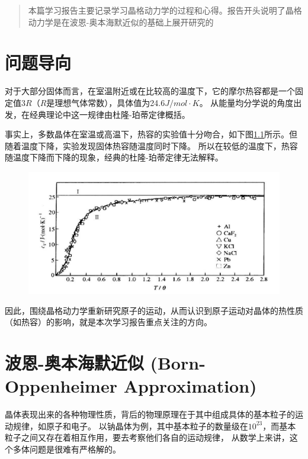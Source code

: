 \documentclass[declarePage]{ecnuthesis}
\begin{document}
\frontmatter


\begin{abstract}
本篇学习报告主要记录学习晶格动力学的过程和心得。报告开头说明了晶格动力学是在波恩-奥本海默近似的基础上展开研究的
\end{abstract}



\mainmatter

\chapter{问题导向} 

对于大部分固体而言，在室温附近或在比较高的温度下，它的摩尔热容都是一个固定值$3R$（$R$是理想气体常数），具体值为24.6$J/mol \cdot K$。%
从能量均分学说的角度出发，在经典理论中这一规律由杜隆-珀蒂定律概括。\cite{xxx}

事实上，多数晶体在室温或高温下，热容的实验值十分吻合，如下图\ref{HC}所示。但随着温度下降，实验发现固体热容随温度同时下降。%
所以在较低的温度下，热容随温度下降而下降的现象，经典的杜隆-珀蒂定律无法解释。
\begin{figure}[htb]
    \centering
    \includegraphics[width=.7\textwidth]{HC.png}
    \label{HC}
\end{figure}

因此，围绕晶格动力学重新研究原子的运动，从而认识到原子运动对晶体的热性质（如热容）的影响，就是本次学习报告重点关注的方向。

\chapter{波恩-奥本海默近似 (Born-Oppenheimer Approximation)}

晶体表现出来的各种物理性质，背后的物理原理在于其中组成具体的基本粒子的运动规律，如原子和电子。%
以钠晶体为例，其中基本粒子的数量级在$10^{23}$，而基本粒子之间又存在着相互作用，要去考察他们各自的运动规律，%
从数学上来讲，这个多体问题是很难有严格解的。
\end{document}
